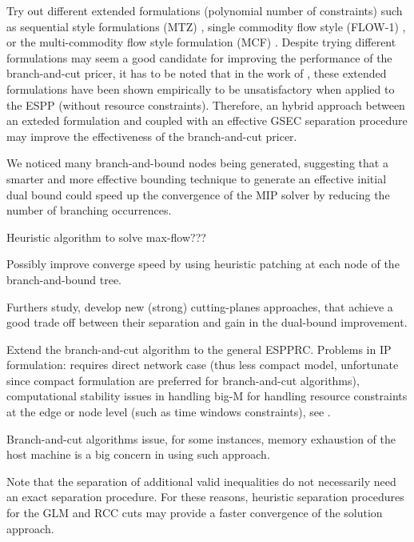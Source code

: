 Try out different extended formulations (polynomial number of constraints)
such as sequential style formulations (MTZ)
\textcite{miller1960}, single commodity flow style (FLOW-1)
\textcite{gavish1978travelling}, or the multi-commodity flow style formulation (MCF)
\textcite{wong1980integer,claus1984new}.
Despite trying different formulations may seem a good candidate for improving
the performance of the branch-and-cut pricer,
it has to be noted that in the work of \textcite{taccari2016},
these extended formulations have been shown empirically
to be unsatisfactory when applied to the ESPP (without resource constraints).
Therefore, an hybrid approach between an exteded formulation
and coupled with an effective GSEC separation procedure may improve
the effectiveness of the branch-and-cut pricer.

\medskip

We noticed many branch-and-bound nodes being generated,
suggesting that a smarter and more effective bounding technique to
generate an effective initial dual bound could speed up the convergence
of the MIP solver by reducing the number of branching occurrences.

Heuristic algorithm to solve max-flow???

Possibly improve converge speed by using heuristic patching at each
node of the branch-and-bound tree.

Furthers study, develop new (strong) cutting-planes approaches,
that achieve a good trade off between their separation and gain
in the dual-bound improvement.

Extend the branch-and-cut algorithm
to the general ESPPRC.
Problems in IP formulation:
requires direct network case (thus less compact model, unfortunate since compact formulation are
preferred for branch-and-cut algorithms),
computational stability issues in handling big-M
for handling resource constraints at the edge or node level (such as time windows constraints),
see \textcite{jepsen2008branchandcut}.

Branch-and-cut algorithms issue, for some instances,
memory exhaustion of the host machine is a big concern in using such approach.

Note that the separation of additional valid inequalities do not
necessarily need an exact separation procedure.
For these reasons, heuristic separation procedures for the GLM and RCC
cuts may provide a faster convergence of the solution approach.

